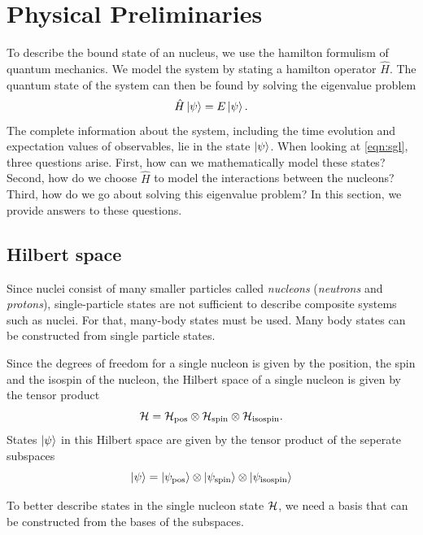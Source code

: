 \section{Physical Preliminaries}
To describe the bound state of an nucleus, we use the hamilton formulism of quantum mechanics. We model the system by stating a hamilton operator $\hat{H}$. The quantum state of the system can then be found by solving the eigenvalue problem
\begin{equation}
  \label{eqn:sgl}
  \hat{H}\ket{\psi} = E\ket\psi.
\end{equation}
The complete information about the system, including the time evolution and expectation values of observables, lie in the state $\ket\psi$. When looking at \eqref{eqn:sgl}, three questions arise. First, how can we mathematically model these states? Second, how do we choose $\hat{H}$ to model the interactions between the nucleons? Third, how do we go about solving this eigenvalue problem? In this section, we provide answers to these questions.
\subsection{Hilbert space}
Since nuclei consist of many smaller particles called \textit{nucleons} (\textit{neutrons} and \textit{protons}), single-particle states are not sufficient to describe composite systems such as nuclei. For that, many-body states must be used. Many body states can be constructed from single particle states.

Since the degrees of freedom for a single nucleon is given by the position, the spin and the isospin of the nucleon, the Hilbert space of a single nucleon is given by the tensor product
\begin{equation}
  \mathcal{H} = \mathcal{H}_\mathrm{pos} \otimes \mathcal{H}_\mathrm{spin} \otimes \mathcal{H}_\mathrm{isospin}.
\end{equation}
States $\ket\psi$ in this Hilbert space are given by the tensor product of the seperate subspaces
\begin{equation}
  \ket\psi = \ket{\psi_\mathrm{pos}}\otimes \ket{\psi_\mathrm{spin}}\otimes \ket{\psi_\mathrm{isospin}}
\end{equation}

To better describe states in the single nucleon state $\mathcal{H}$, we need a basis that can be constructed from the bases of the subspaces.

